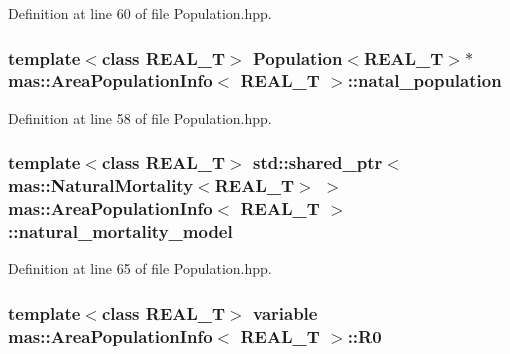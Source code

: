 Definition at line 60 of file Population.\-hpp.

\hypertarget{structmas_1_1_area_population_info_ad4e0348af8d76c0eb5d7ba8120186f78}{
\subsubsection[{natal\-\_\-population}]{\setlength{\rightskip}{0pt plus 5cm}template$<$class R\-E\-A\-L\-\_\-\-T$>$ {\bf Population}$<$R\-E\-A\-L\-\_\-\-T$>$$\ast$ {\bf mas\-::\-Area\-Population\-Info}$<$ R\-E\-A\-L\-\_\-\-T $>$\-::natal\-\_\-population}}\label{structmas_1_1_area_population_info_ad4e0348af8d76c0eb5d7ba8120186f78}


Definition at line 58 of file Population.\-hpp.

\hypertarget{structmas_1_1_area_population_info_a313b0e5b00579750cebccc55fc177ffa}{
\subsubsection[{natural\-\_\-mortality\-\_\-model}]{\setlength{\rightskip}{0pt plus 5cm}template$<$class R\-E\-A\-L\-\_\-\-T$>$ std\-::shared\-\_\-ptr$<${\bf mas\-::\-Natural\-Mortality}$<$R\-E\-A\-L\-\_\-\-T$>$ $>$ {\bf mas\-::\-Area\-Population\-Info}$<$ R\-E\-A\-L\-\_\-\-T $>$\-::natural\-\_\-mortality\-\_\-model}}\label{structmas_1_1_area_population_info_a313b0e5b00579750cebccc55fc177ffa}


Definition at line 65 of file Population.\-hpp.

\hypertarget{structmas_1_1_area_population_info_a945614eeb02706eb328e2b16e49097f2}{
\subsubsection[{R0}]{\setlength{\rightskip}{0pt plus 5cm}template$<$class R\-E\-A\-L\-\_\-\-T$>$ {\bf variable} {\bf mas\-::\-Area\-Population\-Info}$<$ R\-E\-A\-L\-\_\-\-T $>$\-::R0}}\label{structmas_1_1_area_population_info_a945614eeb02706eb328e2b16e49097f2}



